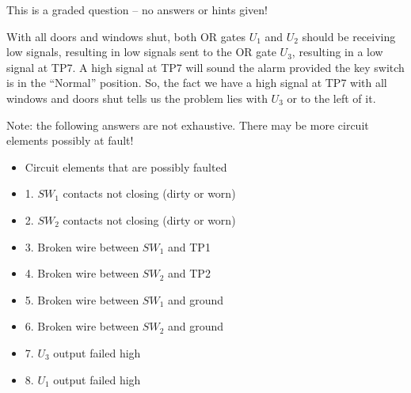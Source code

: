 \vfil 

\eject






This is a graded question -- no answers or hints given!







With all doors and windows shut, both OR gates $U_1$ and $U_2$ should be receiving low signals, resulting in low signals sent to the OR gate $U_3$, resulting in a low signal at TP7.  A high signal at TP7 will sound the alarm provided the key switch is in the ``Normal'' position.  So, the fact we have a high signal at TP7 with all windows and doors shut tells us the problem lies with $U_3$ or to the left of it.

\vskip 10pt

Note: the following answers are not exhaustive.  There may be more circuit elements possibly at fault!

\begin{itemize}
\item{} Circuit elements that are possibly faulted
\item{1.} $SW_1$ contacts not closing (dirty or worn)
\item{2.} $SW_2$ contacts not closing (dirty or worn)
\item{3.} Broken wire between $SW_1$ and TP1
\item{4.} Broken wire between $SW_2$ and TP2
\item{5.} Broken wire between $SW_1$ and ground
\item{6.} Broken wire between $SW_2$ and ground
\item{7.} $U_3$ output failed high
\item{8.} $U_1$ output failed high
\end{itemize}




